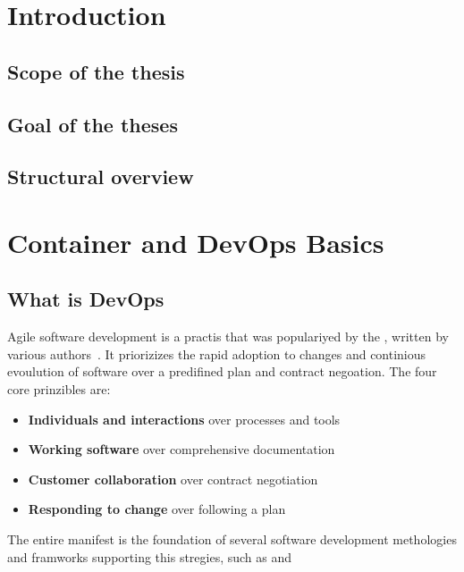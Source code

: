 \documentclass[12pt, a4paper]{article}
\begin{document}


\tableofcontents
{}
\setcounter{lastroman}{\value{page}}

\maketitle
\begin{abstract}
    \lipsum[20]
\end{abstract}
\section{ Introduction}
    \subsection{ Scope of the thesis}
    \subsection{ Goal of the theses}
    \subsection{ Structural overview}
    \newpage
\section{ Container and DevOps Basics}
    \subsection{ What is DevOps}
    Agile software development is a practis that was populariyed by the , written by various authors~\cite{manifesto}. It priorizizes the rapid adoption to changes and continious evoulution of software over a predifined plan and contract negoation.
    The four core prinzibles are:
    \begin{itemize}[label=\(\star\)]
        \item \textbf{Individuals and interactions} over processes and tools
        \item \textbf{Working software} over comprehensive documentation
        \item \textbf{Customer collaboration} over contract negotiation
        \item \textbf{Responding to change} over following a plan
    \end{itemize}
    The entire manifest is the foundation of several software development methologies and framworks supporting this stregies, such as  and 
\end{document}
